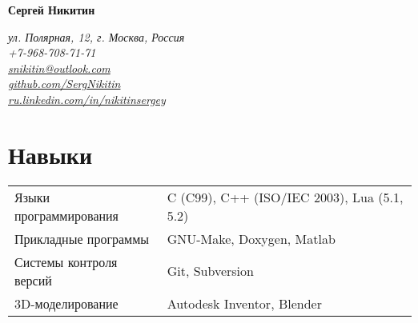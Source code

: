 \documentclass[a4paper, 11pt]{article}
\begin{document}
{\LARGE\textbf{Сергей Никитин}}

\begin{flushright}
    {\itshape
        ул. Полярная, 12, г. Москва, Россия                                                 \\
        +7-968-708-71-71                                                                    \\
        \href{mailto:snikitin@outlook.com}{snikitin@outlook.com}                            \\
        \href{https://github.com/SergNikitin}{github.com/SergNikitin}                       \\
        \href{http://ru.linkedin.com/in/nikitinsergey}{ru.linkedin.com/in/nikitinsergey}    \\
    }
\end{flushright}

\section{Навыки}
\begin{tabular}{ll}
    Языки программирования   & C (C99), C++ (ISO/IEC 2003), Lua (5.1, 5.2)  \\
    Прикладные программы     & GNU-Make, Doxygen, Matlab                    \\
    Системы контроля версий  & Git, Subversion                              \\
    3D-моделирование         & Autodesk Inventor, Blender
\end{tabular}
\end{document}
